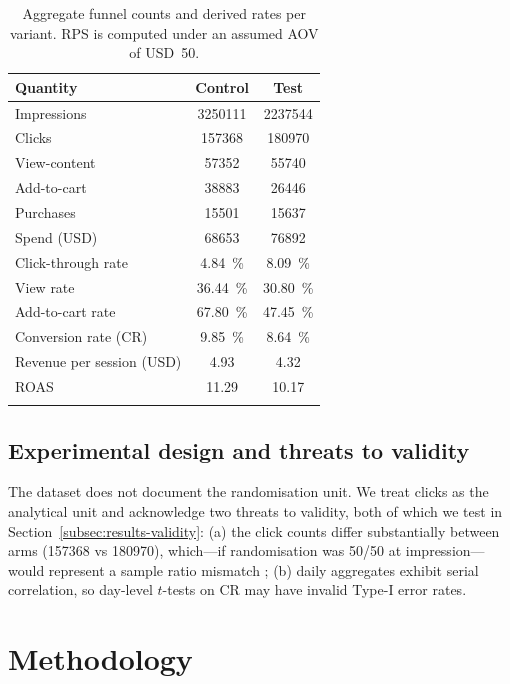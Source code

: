 \documentclass[pdflatex,sn-mathphys-num]{sn-jnl}
\theoremstyle{thmstyleone}
\theoremstyle{thmstyletwo}
\theoremstyle{thmstylethree}
\begin{document}
\begin{table}[h]
\caption{Aggregate funnel counts and derived rates per variant.
RPS is computed under an assumed AOV of USD~50.}\label{tab:dataset}
\begin{tabular}{@{}lcc@{}}
\toprule
Quantity & Control & Test\\
\midrule
Impressions & \num{3250111} & \num{2237544} \\
Clicks & \num{157368} & \num{180970} \\
View-content & \num{57352} & \num{55740} \\
Add-to-cart & \num{38883} & \num{26446} \\
Purchases & \num{15501} & \num{15637} \\
Spend (USD) & \num{68653} & \num{76892} \\
\midrule
Click-through rate & \SI{4.84}{\percent} & \SI{8.09}{\percent} \\
View rate & \SI{36.44}{\percent} & \SI{30.80}{\percent} \\
Add-to-cart rate & \SI{67.80}{\percent} & \SI{47.45}{\percent} \\
Conversion rate (CR) & \SI{9.85}{\percent} & \SI{8.64}{\percent} \\
Revenue per session (USD) & 4.93 & 4.32 \\
ROAS & 11.29 & 10.17 \\
\botrule
\end{tabular}
\end{table}

\subsection{Experimental design and threats to validity}\label{subsec:design}

The dataset does not document the randomisation unit. We treat clicks as the
analytical unit and acknowledge two threats to validity, both of which we test
in Section~\ref{subsec:results-validity}:
(a) the click counts differ substantially between arms (\num{157368} vs \num{180970}),
which—if randomisation was 50/50 at impression—would represent a sample ratio mismatch
\cite{kohavi2020trustworthy};
(b) daily aggregates exhibit serial correlation, so day-level $t$-tests on CR
may have invalid Type-I error rates.

\section{Methodology}\label{sec:method}
\end{document}
